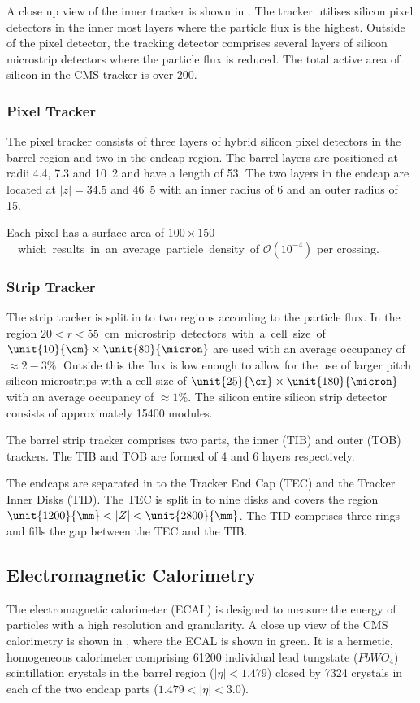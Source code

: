 A close up view of the inner tracker is shown in .  The
tracker utilises silicon pixel detectors in the inner most layers where the
particle flux is the highest.  Outside of the pixel detector, the tracking
detector comprises several layers of silicon microstrip detectors where the
particle flux is reduced.  The total active area of silicon in the CMS tracker
is over \unit{200}{\meter\squared}.\cite{cms}

\subsubsection{Pixel Tracker}
The pixel tracker consists of three layers of hybrid silicon pixel detectors in
the barrel region and two in the endcap region. 
The barrel layers are positioned at radii 4.4, 7.3 and \unit{10.2}{\cm} and have
a length of \unit{53}{\cm}. The two layers in the endcap are located at
$|z|=34.5$ and \unit{46.5}{\cm} with an inner radius of \unit{6}{\cm} and an
outer radius of \unit{15}{\cm}.

Each pixel has a surface area of \unit{$100\times150$}{\micron} which results in
an average particle density of $\mathcal{O}(10^{-4})$ per crossing.

\subsubsection{Strip Tracker}
The strip tracker is split in to two regions according to the particle flux. In
the region \unit{$20<r<55$}{cm} microstrip detectors with a cell size of
$\unit{10}{\cm}\times\unit{80}{\micron}$ are used with an average occupancy of
$\approx\unit{2-3}{\%}$.
Outside this the flux is low enough to allow for the use of larger pitch silicon
microstrips with a cell size of $\unit{25}{\cm}\times\unit{180}{\micron}$ with
an average occupancy of $\approx\unit{1}{\%}$.
The silicon entire silicon strip detector consists of approximately 15400
modules.

The barrel strip tracker comprises two parts, the inner (TIB) and outer (TOB)
trackers. The TIB and TOB are formed of 4 and 6 layers respectively.

The endcaps are separated in to the Tracker End Cap (TEC) and the Tracker Inner
Disks (TID). The TEC is split in to nine disks and covers the region
$\unit{1200}{\mm} < |Z| < \unit{2800}{\mm}$. The TID comprises three rings
and fills the gap between the TEC and the TIB.

\subsection{Electromagnetic Calorimetry}
The electromagnetic calorimeter (ECAL) is 
designed to measure the energy of
particles with a high resolution and granularity.
A close up view of the CMS calorimetry is shown in , where the
ECAL is shown in green.
It is a hermetic, homogeneous calorimeter comprising 61200 individual lead
tungstate ($PbWO_{4}$) scintillation crystals in the barrel region
($|\eta|<1.479$) closed by 7324 crystals in each of the two endcap parts
($1.479<|\eta|<3.0$).


